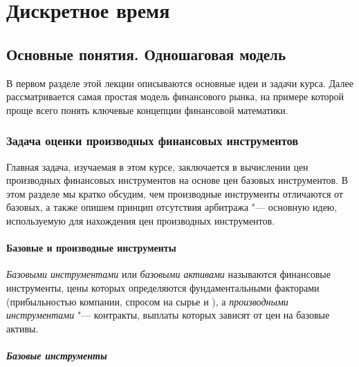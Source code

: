 
\part{Дискретное время}

\chapter{Основные понятия. Одношаговая модель}
\label{ch:onestep}
\chaptertoc

В первом разделе этой лекции описываются основные идеи и задачи курса.
Далее рассматривается самая простая модель финансового рынка, на примере которой проще всего понять ключевые концепции финансовой математики.

\section{Задача оценки производных финансовых инструментов}

Главная задача, изучаемая в этом курсе, заключается в вычислении цен производных финансовых инструментов на основе цен базовых инструментов.
В этом разделе мы кратко обсудим, чем производные инструменты отличаются от базовых, а также опишем принцип отсутствия арбитража "--- основную идею, используемую для нахождения цен производных инструментов.


\subsection{Базовые и производные инструменты}

\emph{Базовыми инструментами} или \emph{базовыми активами} называются финансовые инструменты, цены которых определяются фундаментальными факторами (прибыльностью компании, спросом на сырье и \td), а \emph{производными инструментами} "--- контракты, выплаты которых зависят от цен на базовые активы. 


\subsubsection{Базовые инструменты}

